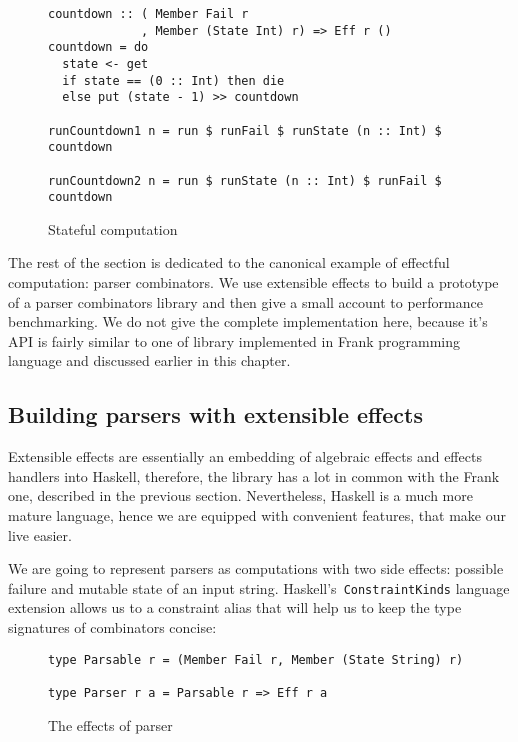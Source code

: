    \begin{figure}[h]
    \begin{lstlisting}
countdown :: ( Member Fail r
             , Member (State Int) r) => Eff r ()
countdown = do
  state <- get
  if state == (0 :: Int) then die
  else put (state - 1) >> countdown

runCountdown1 n = run $ runFail $ runState (n :: Int) $ countdown

runCountdown2 n = run $ runState (n :: Int) $ runFail $ countdown
    \end{lstlisting}
    \caption{Stateful computation}
    \label{listing:ExtEffCountdown}
    \end{figure}

    The rest of the section is dedicated to the canonical example of effectful computation:
    parser combinators. We use extensible effects to build a prototype of a parser combinators
    library and then give a small account to performance benchmarking.
    We do not give the complete implementation here, because it's API is fairly
    similar to one of library implemented in Frank programming language and
    discussed earlier in this chapter.

    \subsection{Building parsers with extensible effects}

      Extensible effects are essentially an embedding of algebraic effects and effects handlers
      into Haskell, therefore, the library has a lot in common with the Frank one, described
      in the previous section. Nevertheless, Haskell is a much more mature language, hence
      we are equipped with convenient features, that make our live easier.

      We are going to represent parsers as computations with two side effects: possible failure
      and mutable state of an input string.
      Haskell's~\texttt{ConstraintKinds} language extension allows us to
      a constraint alias that will help us to keep the type signatures of combinators concise:

      \begin{figure}[h]
      \begin{lstlisting}
type Parsable r = (Member Fail r, Member (State String) r)

type Parser r a = Parsable r => Eff r a
      \end{lstlisting}
      \caption{The effects of parser}
      \label{listing:ExtEffCountdown}
      \end{figure}

